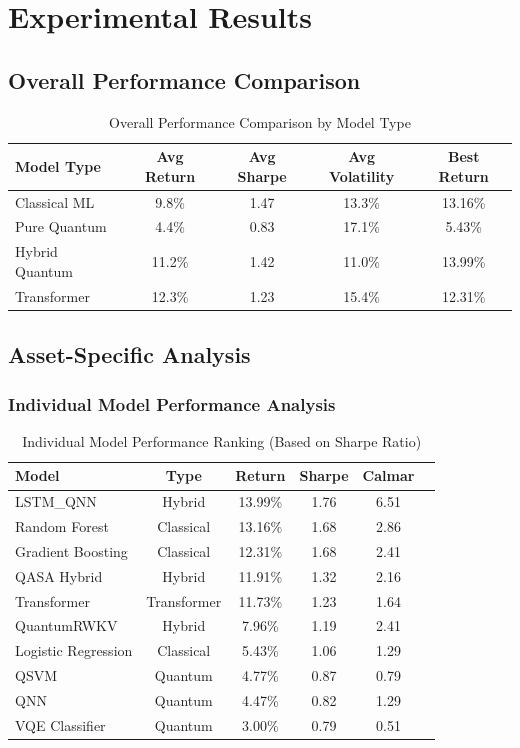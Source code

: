 \documentclass[12pt,a4paper]{article}
\begin{document}
\section{Experimental Results}

\subsection{Overall Performance Comparison}

\begin{table}[H]
\centering
\begin{tabular}{@{}lcccc@{}}
\toprule
\textbf{Model Type} & \textbf{Avg Return} & \textbf{Avg Sharpe} & \textbf{Avg Volatility} & \textbf{Best Return} \\
\midrule
Classical ML & 9.8\% & 1.47 & 13.3\% & 13.16\% \\
Pure Quantum & 4.4\% & 0.83 & 17.1\% & 5.43\% \\
Hybrid Quantum & 11.2\% & 1.42 & 11.0\% & 13.99\% \\
Transformer & 12.3\% & 1.23 & 15.4\% & 12.31\% \\
\bottomrule
\end{tabular}
\caption{Overall Performance Comparison by Model Type}
\end{table}

\subsection{Asset-Specific Analysis}

\subsubsection{Individual Model Performance Analysis}

\begin{table}[H]
\centering
\begin{tabular}{@{}lccccc@{}}
\toprule
\textbf{Model} & \textbf{Type} & \textbf{Return} & \textbf{Sharpe} & \textbf{Calmar} \\
\midrule
LSTM\_QNN & Hybrid & 13.99\% & 1.76 & 6.51 \\
Random Forest & Classical & 13.16\% & 1.68 & 2.86 \\
Gradient Boosting & Classical & 12.31\% & 1.68 & 2.41 \\
QASA Hybrid & Hybrid & 11.91\% & 1.32 & 2.16 \\
Transformer & Transformer & 11.73\% & 1.23 & 1.64 \\
QuantumRWKV & Hybrid & 7.96\% & 1.19 & 2.41 \\
Logistic Regression & Classical & 5.43\% & 1.06 & 1.29 \\
QSVM & Quantum & 4.77\% & 0.87 & 0.79 \\
QNN & Quantum & 4.47\% & 0.82 & 1.29 \\
VQE Classifier & Quantum & 3.00\% & 0.79 & 0.51 \\
\bottomrule
\end{tabular}
\caption{Individual Model Performance Ranking (Based on Sharpe Ratio)}
\end{table}
\end{document}
